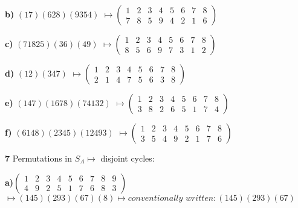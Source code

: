 \documentclass{article}
\begin{document}
					\bigskip
					
\hspace{.3in}\textbf{b)}
$(17)(628)(9354)$             $\mapsto (\begin{smallmatrix}
					1 & 2 & 3 & 4 & 5 & 6 & 7 & 8 \\
					7 & 8  & 5 & 9 & 4  & 2 & 1 & 6
					\end{smallmatrix})$ 
					
					\bigskip

\hspace{.3in}\textbf{c)}
$(71825)(36)(49)$             $\mapsto (\begin{smallmatrix}
					1 & 2 & 3 & 4 & 5 & 6 & 7 & 8 \\
					 8& 5 & 6 & 9 & 7 & 3 & 1 & 2
					\end{smallmatrix})$ 
					
					 \bigskip
\hspace{.3in}\textbf{d)}
$(12)(347)$            		 $\mapsto (\begin{smallmatrix}
					1 & 2 & 3 & 4 & 5 & 6 & 7 & 8 \\
					2 & 1 & 4 & 7 & 5 & 6 & 3 & 8
					\end{smallmatrix})$ 
					
					 \bigskip

\hspace{.3in}\textbf{e)}
$(147)(1678)(74132)$     $\mapsto (\begin{smallmatrix}
					1 & 2 & 3 & 4 & 5 & 6 & 7 & 8 \\
					3 & 8 & 2 & 6 & 5 & 1 & 7 & 4
					\end{smallmatrix})$ 
					
					 \bigskip
					
\hspace{.3in}\textbf{f)}
$(6148)(2345)(12493)$   $\mapsto (\begin{smallmatrix}
					1 & 2 & 3 & 4 & 5 & 6 & 7 & 8 \\
					3 & 5 & 4 & 9 & 2 & 1 & 7 & 6
					\end{smallmatrix})$
					
\bigskip
					
\textbf{7} Permutations in $S_A \mapsto$ disjoint cycles: 

\medskip 


\hspace{.2in}\textbf{a)}$(\begin{smallmatrix}
1 & 2 & 3 & 4 & 5 & 6 & 7 & 8 & 9\\
4 & 9 & 2 & 5 & 1 & 7 & 6 & 8 & 3
\end{smallmatrix})$			
						$\mapsto(145)(293)(67)(8)\mapsto \textit{conventionally written}: (145)(293)(67)$
\end{document}
